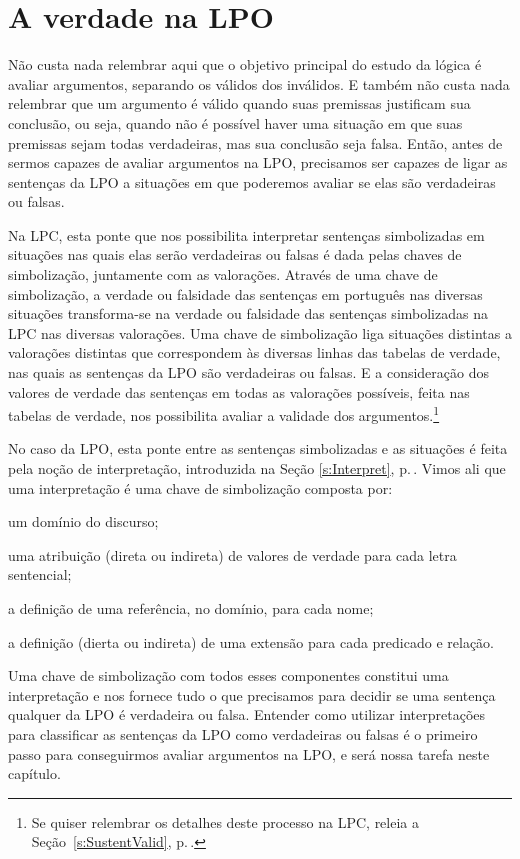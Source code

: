 \chapter{A verdade na LPO}\label{s:TruthFOL}
Não custa nada relembrar aqui que o objetivo principal do estudo da lógica é avaliar argumentos, separando os válidos dos inválidos.
E também não custa nada relembrar que um argumento é válido quando suas premissas justificam sua conclusão, ou seja, quando não é possível haver uma situação em que suas premissas sejam todas verdadeiras, mas sua conclusão seja falsa.
Então, antes de sermos capazes de avaliar argumentos na LPO, precisamos ser capazes de ligar as sentenças da LPO a situações em que poderemos avaliar se elas são verdadeiras ou falsas.

Na LPC, esta ponte que nos possibilita interpretar sentenças simbolizadas em situações nas quais elas serão verdadeiras ou falsas é dada pelas chaves de simbolização, juntamente com as valorações.
Através de uma chave de simbolização, a verdade ou falsidade das sentenças em português nas diversas situações transforma-se na verdade ou falsidade das sentenças simbolizadas na LPC nas diversas valorações.
Uma chave de simbolização liga situações distintas a valorações distintas que correspondem às diversas linhas das tabelas de verdade, nas quais as sentenças da LPO são verdadeiras ou falsas.
E a consideração dos valores de verdade das sentenças em todas as valorações possíveis, feita nas tabelas de verdade, nos possibilita avaliar a validade dos argumentos.\footnote{
	Se quiser relembrar os detalhes deste processo na LPC, releia a Seção~\ref{s:SustentValid}, p.\,\pageref{s:SustentValid}.}

No caso da LPO, esta ponte entre as sentenças simbolizadas e as situações é feita pela noção de interpretação, introduzida na Seção \ref{s:Interpret}, p.\,\pageref{s:Interpret}.
Vimos ali que uma interpretação é uma chave de simbolização composta por: 
\begin{ebullet}
	\item um domínio do discurso;
	\item uma atribuição (direta ou indireta) de valores de verdade para cada letra sentencial;
	\item a definição de uma referência, no domínio, para cada nome;
	\item a definição (dierta ou indireta) de uma extensão para cada predicado e relação.
\end{ebullet}
Uma chave de simbolização com todos esses componentes constitui uma interpretação e nos fornece tudo o que precisamos para decidir se uma sentença qualquer da LPO é verdadeira ou falsa.
Entender como utilizar interpretações para classificar as sentenças da LPO como verdadeiras ou falsas é o primeiro passo para conseguirmos avaliar argumentos na LPO, e será nossa tarefa neste capítulo.

